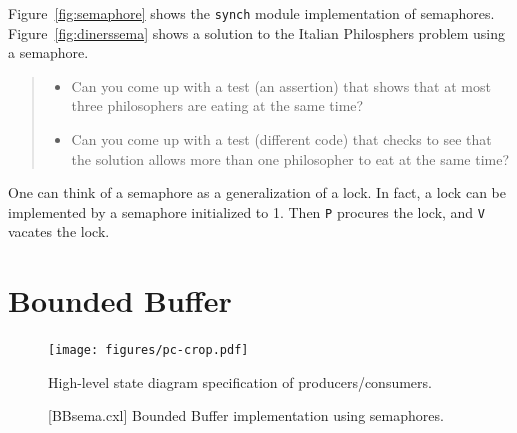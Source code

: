 \documentclass{report}
\newenvironment{code}{
\tcolorbox
}{
\endtcolorbox
}
\begin{document}
Figure~\ref{fig:semaphore} shows the \texttt{synch} module implementation of
semaphores.
Figure~\ref{fig:dinerssema} shows a solution to the Italian Philosphers problem
using a semaphore.

\begin{quote}
\begin{itemize}
\item Can you come up with a test (an assertion) that shows that at most three
philosophers are eating at the same time?
\item Can you come up with a test (different code) that checks to see that
the solution allows more than one philosopher to eat at the same time?
\end{itemize}
\end{quote}

One can think of a semaphore as a generalization of a lock.  In fact, a
lock can be implemented by a semaphore initialized to 1.  Then \texttt{P}
procures the lock, and \texttt{V} vacates the lock.

\chapter{Bounded Buffer}

\begin{figure}
\begin{center}
\texttt{[image: figures/pc-crop.pdf]}
\end{center}
\caption{High-level state diagram specification of producers/consumers.}
\label{fig:pc}
\end{figure}

\begin{figure}
\begin{code}
\end{code}
\caption{[BBsema.cxl] Bounded Buffer implementation using semaphores.}
\label{fig:boundedbuffer}
\end{figure}
\end{document}
